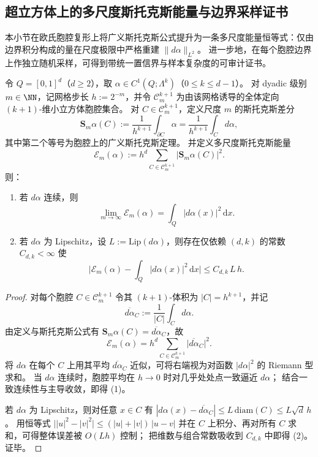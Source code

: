 \subsection{超立方体上的多尺度斯托克斯能量与边界采样证书}\label{subsec:conclusion-multiscale-stokes-energy-sampling}
本小节在欧氏胞腔复形上将广义斯托克斯公式提升为一条多尺度能量恒等式：仅由边界积分构成的量在尺度极限中严格重建 \(\|d\alpha\|_{L^2}\)。
进一步地，在每个胞腔边界上作独立随机采样，可得到带统一置信界与样本复杂度的可审计证书。



\begin{theorem}[多尺度斯托克斯能量的 \(L^2\) 重建]\label{thm:conclusion-multiscale-stokes-energy-l2-reconstruction}
令 \(Q=[0,1]^d\)（\(d\ge 2\)），取 \(\alpha\in C^{1}(Q;\Lambda^{k})\)（\(0\le k\le d-1\)）。
对 dyadic 级别 \(m\in\NN\)，记网格步长 \(h:=2^{-m}\)，并令 \(\mathcal C_m^{k+1}\) 为由该网格诱导的全体定向 \((k+1)\)-维小立方体胞腔集合。
对 \(C\in\mathcal C_m^{k+1}\)，定义尺度 \(m\) 的斯托克斯差分
\[
\mathbf S_m\alpha(C)
:=\frac{1}{h^{k+1}}\int_{\partial C}\alpha
=\frac{1}{h^{k+1}}\int_C d\alpha,
\]
其中第二个等号为胞腔上的广义斯托克斯定理。
并定义多尺度斯托克斯能量
\[
\mathcal E_m(\alpha):=h^d\sum_{C\in\mathcal C_m^{k+1}}\bigl|\mathbf S_m\alpha(C)\bigr|^2.
\]
则：
\begin{enumerate}
  \item 若 \(d\alpha\) 连续，则
  \[
  \lim_{m\to\infty}\mathcal E_m(\alpha)=\int_Q |d\alpha(x)|^2\,\mathrm dx.
  \]
  \item 若 \(d\alpha\) 为 Lipschitz，设 \(L:=\mathrm{Lip}(d\alpha)\)，则存在仅依赖 \((d,k)\) 的常数 \(C_{d,k}<\infty\) 使
  \[
  \biggl|\mathcal E_m(\alpha)-\int_Q |d\alpha(x)|^2\,\mathrm dx\biggr|
  \le C_{d,k}\,L\,h.
  \]
\end{enumerate}
\end{theorem}

\begin{proof}
对每个胞腔 \(C\in\mathcal C_m^{k+1}\) 令其 \((k{+}1)\)-体积为 \(|C|=h^{k+1}\)，并记
\[
\overline{d\alpha}_C:=\frac1{|C|}\int_C d\alpha.
\]
由定义与斯托克斯公式有 \(\mathbf S_m\alpha(C)=\overline{d\alpha}_C\)，故
\[
\mathcal E_m(\alpha)
=h^d\sum_{C\in\mathcal C_m^{k+1}}\bigl|\overline{d\alpha}_C\bigr|^2.
\]
将 \(d\alpha\) 在每个 \(C\) 上用其平均 \(\overline{d\alpha}_C\) 近似，可将右端视为对函数 \(|d\alpha|^2\) 的 Riemann 型求和。
当 \(d\alpha\) 连续时，胞腔平均在 \(h\to 0\) 时对几乎处处点一致逼近 \(d\alpha\)；
结合一致连续性与主导收敛，即得 (1)。

若 \(d\alpha\) 为 Lipschitz，则对任意 \(x\in C\) 有
\(
|d\alpha(x)-\overline{d\alpha}_C|\le L\,\mathrm{diam}(C)\le L\sqrt d\,h
\)。
用恒等式
\(
\bigl||u|^2-|v|^2\bigr|\le (|u|+|v|)\,|u-v|
\)
并在 \(C\) 上积分、再对所有 \(C\) 求和，可得整体误差被 \(O(Lh)\) 控制；
把维数与组合常数吸收到 \(C_{d,k}\) 中即得 (2)。证毕。
\end{proof}

